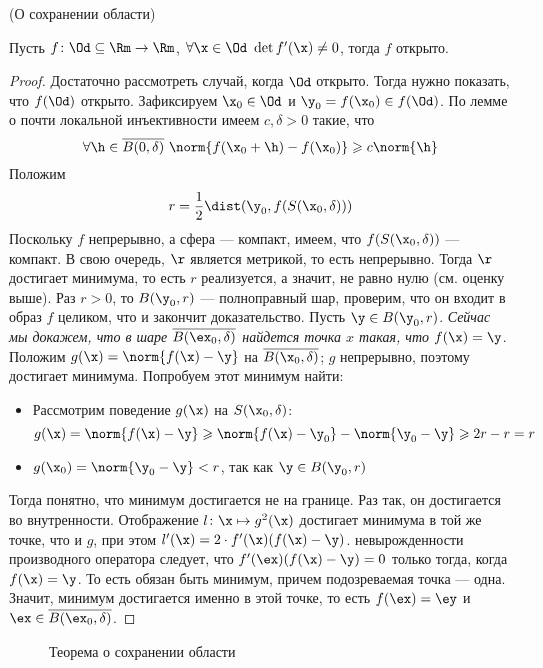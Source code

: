 \begin{theorem}(О сохранении области)

    Пусть $f \colon \Od \subseteq \Rm \to \Rm$, $\forall \x \in \Od~ \det{f'(\x)}
    \neq 0$, тогда $f$ открыто.
\end{theorem}
\begin{proof}
    Достаточно рассмотреть случай, когда $\Od$ открыто. Тогда нужно показать, что
    $f(\Od)$ открыто. Зафиксируем $\x_0 \in \Od$ и $\y_0 = f(\x_0) \in f(\Od)$.
    По лемме о почти локальной инъективности имеем $c, \delta > 0$ такие, что
\[
    \forall \h \in \overline{B(0, \delta)}~ \norm{f(\x_0 + \h) - f(\x_0)}
    \geqslant c \norm{\h}
\]
    Положим
\[
    r = \frac{1}{2}\dist(\y_0, f(S(\x_0, \delta)))
\]
    Поскольку $f$ непрерывно, а сфера --- компакт, имеем, что $f(S(\x_0, \delta))$
    --- компакт. В свою очередь, $\r$ является метрикой, то есть непрерывно. Тогда
    $\r$ достигает минимума, то есть $r$ реализуется, а значит, не равно нулю
    (см. оценку выше). Раз $r > 0$, то $B(\y_0, r)$ --- полноправный шар,
    проверим, что он входит в образ $f$ целиком, что и закончит доказательство.
	Пусть $\y \in B(\y_0, r)$. \textit{Сейчас мы докажем, что в шаре 
	$\overline{B(\ex_0, \delta)}$ найдется точка $x$ такая, что 
	$f(\x) = \y$}. Положим $g(\x) = \norm{f(\x) - \y}$ на
    $\overline{B(\x_0, \delta)}$; $g$ непрерывно, поэтому достигает минимума.
    Попробуем этот минимум найти:
\begin{itemize}
    \item Рассмотрим поведение $g(\x)$ на $S(\x_0, \delta)$:
\[
    g(\x) = \norm{f(\x) - \y} \geqslant \norm{f(\x) - \y_0} - \norm{\y_0 - \y}
    \geqslant 2r - r = r
\]
    \item $g(\x_0) = \norm{\y_0 - \y} < r$, так как $\y \in B(\y_0, r)$
\end{itemize}
    Тогда понятно, что минимум достигается не на границе. Раз так, он достигается
    во внутренности. Отображение $l\colon \x \mapsto g^2(\x)$ достигает минимума в
    той же точке, что и $g$, при этом $l'(\x) = 2 \cdot f'(\x)(f(\x) - \y)$. 
	невырожденности производного оператора следует, что $f'(\ex)(f(\x) - \y) = 0$
	только тогда, когда $f(\x) = \y$. То есть обязан быть минимум, причем подозреваемая
	точка --- одна. Значит, минимум достигается именно в этой точке, то есть 
	$f(\ex) = \ey$ и $\ex \in \overline{B(\ex_0, \delta)}$.
\end{proof}

\begin{figure}[ht]
    \centering
    \caption{Теорема о сохранении области}
\end{figure}

